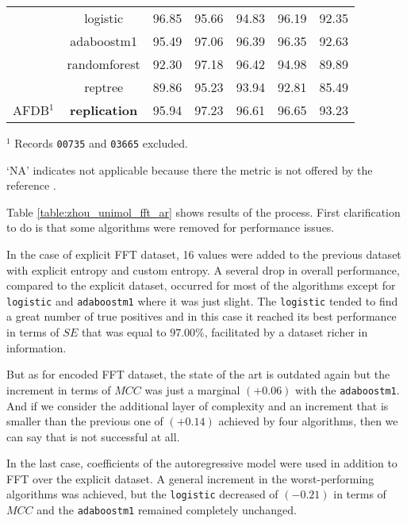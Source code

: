 \begin{table}[h]
\begin{center}
\begin{threeparttable}
\begin{tabular}{c c c c c c c}
  & logistic & 96.85 & 95.66 & 94.83 & 96.19 & 92.35 \\
  & adaboostm1 & 95.49 & 97.06 & 96.39 & 96.35 & 92.63 \\
  & randomforest & 92.30 & 97.18 & 96.42 & 94.98 & 89.89 \\
  & reptree & 89.86 & 95.23 & 93.94 & 92.81 & 85.49 \\
  \hline
  AFDB$^1$ & \textbf{replication} & 95.94 & 97.23 & 96.61 & 96.65 & 93.23 \\
  \bottomrule
\end{tabular}
\begin{tablenotes}
	\item $^1$ Records \verb|00735| and \verb|03665| excluded.
 	\item ‘NA’ indicates not applicable because there the metric is not offered by the reference \cite{zhou2015}.
    \end{tablenotes}
\end{threeparttable}
\end{center}
\end{table}
Table \ref{table:zhou_unimol_fft_ar} shows results of the process. First clarification to do is that some algorithms were removed for performance issues.

In the case of explicit FFT dataset, 16 values were added to the previous dataset with explicit entropy and custom entropy. A several drop in overall performance, compared to the explicit dataset, occurred for most of the algorithms except for \verb|logistic| and \verb|adaboostm1| where it was just slight. The \verb|logistic| tended to find a great number of true positives and in this case it reached its best performance in terms of $SE$ that was equal to $97.00\%$, facilitated by a dataset richer in information.

But as for encoded FFT dataset, the state of the art is outdated again but the increment in terms of $MCC$ was just a marginal $(+0.06)$ with the \verb|adaboostm1|. And if we consider the additional layer of complexity and an increment that is smaller than the previous one of $(+0.14)$ achieved by four algorithms, then we can say that is not successful at all.

In the last case, coefficients of the autoregressive model were used in addition to FFT over the explicit dataset. A general increment in the worst-performing algorithms was achieved, but the \verb|logistic| decreased of $(-0.21)$ in terms of $MCC$ and the \verb|adaboostm1| remained completely unchanged. 


